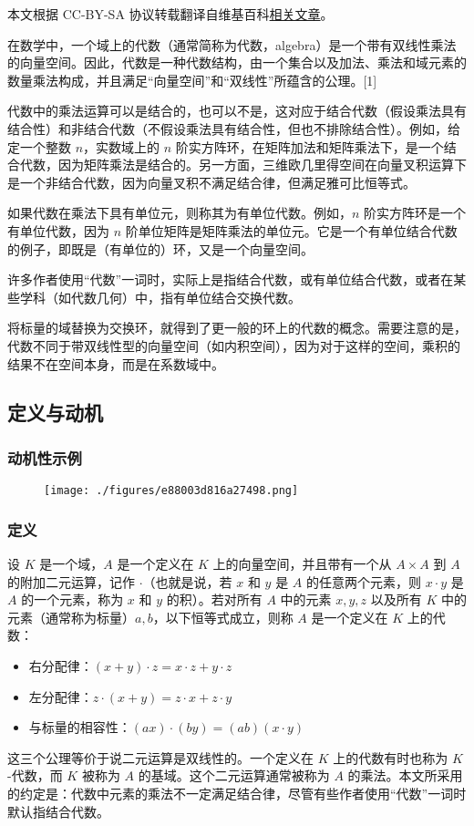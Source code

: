 
本文根据 CC-BY-SA 协议转载翻译自维基百科\href{https://en.wikipedia.org/wiki/Algebra_over_a_field}{相关文章}。

在数学中，一个域上的代数（通常简称为代数，algebra）是一个带有双线性乘法的向量空间。因此，代数是一种代数结构，由一个集合以及加法、乘法和域元素的数量乘法构成，并且满足“向量空间”和“双线性”所蕴含的公理。[1]

代数中的乘法运算可以是结合的，也可以不是，这对应于结合代数（假设乘法具有结合性）和非结合代数（不假设乘法具有结合性，但也不排除结合性）。例如，给定一个整数 $n$，实数域上的 $n$ 阶实方阵环，在矩阵加法和矩阵乘法下，是一个结合代数，因为矩阵乘法是结合的。另一方面，三维欧几里得空间在向量叉积运算下是一个非结合代数，因为向量叉积不满足结合律，但满足雅可比恒等式。

如果代数在乘法下具有单位元，则称其为有单位代数。例如，$n$ 阶实方阵环是一个有单位代数，因为 $n$ 阶单位矩阵是矩阵乘法的单位元。它是一个有单位结合代数的例子，即既是（有单位的）环，又是一个向量空间。

许多作者使用“代数”一词时，实际上是指结合代数，或有单位结合代数，或者在某些学科（如代数几何）中，指有单位结合交换代数。

将标量的域替换为交换环，就得到了更一般的环上的代数的概念。需要注意的是，代数不同于带双线性型的向量空间（如内积空间），因为对于这样的空间，乘积的结果不在空间本身，而是在系数域中。
\subsection{定义与动机}
\subsubsection{动机性示例}
\begin{figure}[ht]
\centering
\texttt{[image: ./figures/e88003d816a27498.png]}
\caption{} \label{fig_YSds_1}
\end{figure}
\subsubsection{定义}
设 $K$ 是一个域，$A$ 是一个定义在 $K$ 上的向量空间，并且带有一个从 $A \times A$ 到 $A$ 的附加二元运算，记作 $\cdot$（也就是说，若 $x$ 和 $y$ 是 $A$ 的任意两个元素，则 $x \cdot y$ 是 $A$ 的一个元素，称为 $x$ 和 $y$ 的积）。若对所有 $A$ 中的元素 $x, y, z$ 以及所有 $K$ 中的元素（通常称为标量）$a, b$，以下恒等式成立，则称 $A$ 是一个定义在 $K$ 上的代数：
\begin{itemize}
\item 右分配律：$(x + y) \cdot z = x \cdot z + y \cdot z$
\item 左分配律：$z \cdot (x + y) = z \cdot x + z \cdot y$
\item 与标量的相容性：$(a x) \cdot (b y) = (ab)(x \cdot y)$
\end{itemize}
这三个公理等价于说二元运算是双线性的。一个定义在 $K$ 上的代数有时也称为 $K$-代数，而 $K$ 被称为 $A$ 的基域。这个二元运算通常被称为 $A$ 的乘法。本文所采用的约定是：代数中元素的乘法不一定满足结合律，尽管有些作者使用“代数”一词时默认指结合代数。

